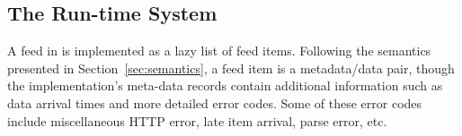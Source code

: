 \subsection{The Run-time System}
A feed in \padsd{} is implemented as a lazy list of feed
items. 
Following the semantics presented in Section~\ref{sec:semantics}, 
a feed item is a metadata/data pair,
though the implementation's meta-data records contain additional information
such as data arrival times and more detailed error codes. 
Some of these error codes include miscellaneous HTTP error, late item
arrival, parse error, etc.




